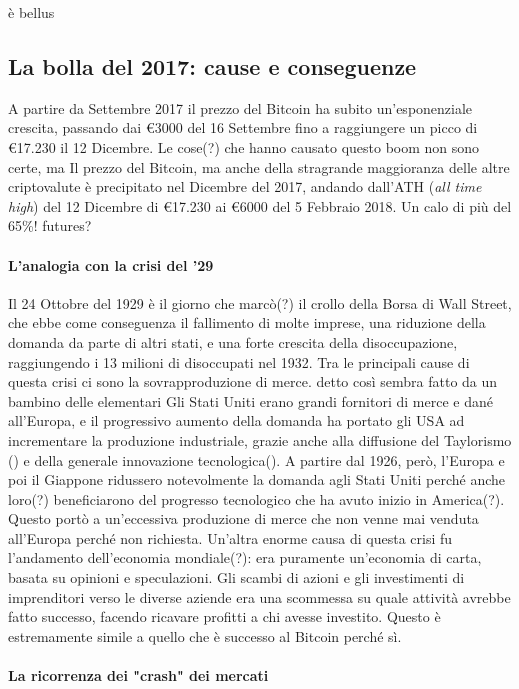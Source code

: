 \documentclass {article}
\begin{document}
{è bellus


\subsection {La bolla del 2017: cause e conseguenze}


A partire da Settembre 2017 il prezzo del Bitcoin ha subito un'esponenziale crescita, passando dai \euro{3000} del 16 Settembre fino a raggiungere un picco di \euro{17.230} il 12 Dicembre.
Le cose(?) che hanno causato questo boom non sono certe, ma
Il prezzo del Bitcoin, ma anche della stragrande maggioranza delle altre criptovalute è precipitato nel Dicembre del 2017, andando dall'ATH (\textit{all time high}) del 12 Dicembre di \euro{17.230} ai \euro{6000} del 5 Febbraio 2018. Un calo di più del 65\%!
futures?


\paragraph {L'analogia con la crisi del '29}


Il 24 Ottobre del 1929 è il giorno che marcò(?) il crollo della Borsa di Wall Street, che ebbe come conseguenza il fallimento di molte imprese, una riduzione della domanda da parte di altri stati, e una forte crescita della disoccupazione, raggiungendo i 13 milioni di disoccupati nel 1932.
Tra le principali cause di questa crisi ci sono la sovrapproduzione di merce. detto così sembra fatto da un bambino delle elementari
Gli Stati Uniti erano grandi fornitori di merce e dané all'Europa, e il progressivo aumento della domanda ha portato gli USA ad incrementare la produzione industriale, grazie anche alla diffusione del Taylorismo () e della generale innovazione tecnologica().
A partire dal 1926, però, l'Europa e poi il Giappone ridussero notevolmente la domanda agli Stati Uniti perché anche loro(?) beneficiarono del progresso tecnologico che ha avuto inizio in America(?).
Questo portò a un'eccessiva produzione di merce che non venne mai venduta all'Europa perché non richiesta.
Un'altra enorme causa di questa crisi fu l'andamento dell'economia mondiale(?): era puramente un'economia di carta, basata su opinioni e speculazioni.
Gli scambi di azioni e gli investimenti di imprenditori verso le diverse aziende era una scommessa su quale attività avrebbe fatto successo, facendo ricavare profitti a chi avesse investito.
Questo è estremamente simile a quello che è successo al Bitcoin perché sì.


\paragraph {La ricorrenza dei "crash" dei mercati}


}
\end{document}
